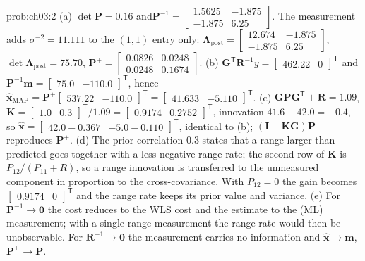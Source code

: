 \documentclass[graybox,envcountchap]{style/SNmono}
\providecommand{\DIFaddbegin}{} %
\providecommand{\DIFaddend}{} %
\begin{document}
\begin{sol}{prob:ch03:2}
(a) $\det\mathbf{P}=0.16$ and\DIFaddbegin \allowbreak \DIFaddend $\mathbf{P}^{-1}=\begin{bmatrix}1.5625&-1.875\\-1.875&6.25\end{bmatrix}$. The measurement adds $\sigma^{-2}=11.111$ to the $(1,1)$ entry only:
$\mathbf{\Lambda}_{\mathrm{post}}=\begin{bmatrix}12.674&-1.875\\-1.875&6.25\end{bmatrix}$, $\det\mathbf{\Lambda}_{\mathrm{post}}=75.70$,
$\mathbf{P}^{+}=\begin{bmatrix}0.0826&0.0248\\0.0248&0.1674\end{bmatrix}$.
(b) $\mathbf{G}^{\mathsf T}\mathbf{R}^{-1}y=\begin{bmatrix}462.22&0\end{bmatrix}^{\mathsf T}$ and\DIFaddbegin \allowbreak \DIFaddend $\mathbf{P}^{-1}\mathbf{m}=\begin{bmatrix}75.0&-110.0\end{bmatrix}^{\mathsf T}$, hence $\widehat{\mathbf{x}}_{\mathrm{MAP}}=\mathbf{P}^{+}\begin{bmatrix}537.22&-110.0\end{bmatrix}^{\mathsf T}=\begin{bmatrix}41.633&-5.110\end{bmatrix}^{\mathsf T}$.
(c) $\mathbf{G}\mathbf{P}\mathbf{G}^{\mathsf T}+\mathbf{R}=1.09$, $\mathbf{K}=\begin{bmatrix}1.0&0.3\end{bmatrix}^{\mathsf T}/1.09=\begin{bmatrix}0.9174&0.2752\end{bmatrix}^{\mathsf T}$, innovation $41.6-42.0=-0.4$, so $\widehat{\mathbf{x}}=\begin{bmatrix}42.0-0.367&-5.0-0.110\end{bmatrix}^{\mathsf T}$, identical to (b); $(\mathbf{I}-\mathbf{K}\mathbf{G})\mathbf{P}$ reproduces $\mathbf{P}^{+}$.
(d) The prior correlation $0.3$ states that a range larger than predicted goes together with a less negative range rate; the second row of $\mathbf{K}$ is $P_{12}/(P_{11}+R)$, so a range innovation is transferred to the unmeasured component in proportion to the cross-covariance. With $P_{12}=0$ the gain becomes $\begin{bmatrix}0.9174&0\end{bmatrix}^{\mathsf T}$ and the range rate keeps its prior value and variance.
(e) For $\mathbf{P}^{-1}\to\mathbf{0}$ the cost reduces to the WLS cost and the estimate to the (ML) measurement; with a single range measurement the range rate would then be unobservable. For $\mathbf{R}^{-1}\to\mathbf{0}$ the measurement carries no information and $\widehat{\mathbf{x}}\to\mathbf{m}$, $\mathbf{P}^{+}\to\mathbf{P}$.
\end{sol}
\end{document}
